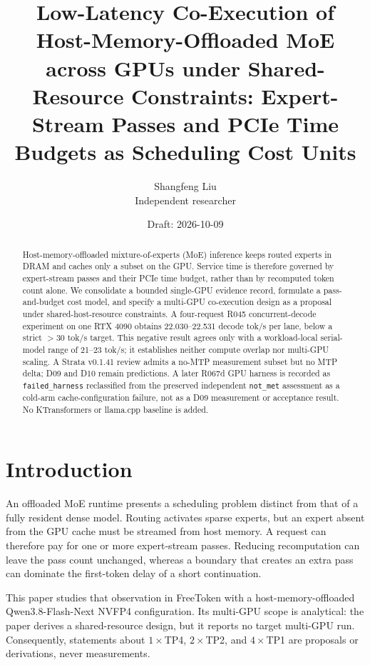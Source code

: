 \documentclass[11pt]{article}
\title{Low-Latency Co-Execution of Host-Memory-Offloaded MoE across GPUs under Shared-Resource Constraints: Expert-Stream Passes and PCIe Time Budgets as Scheduling Cost Units}
\author{Shangfeng Liu\\Independent researcher}
\date{Draft: 2026-10-09}
\begin{document}
\maketitle

\begin{abstract}
Host-memory-offloaded mixture-of-experts (MoE) inference keeps routed experts in DRAM and caches only a subset on the GPU. Service time is therefore governed by expert-stream passes and their PCIe time budget, rather than by recomputed token count alone. We consolidate a bounded single-GPU evidence record, formulate a pass-and-budget cost model, and specify a multi-GPU co-execution design as a proposal under shared-host-resource constraints. A four-request R045 concurrent-decode experiment on one RTX 4090 obtains 22.030--22.531 decode tok/s per lane, below a strict $>30$ tok/s target. This negative result agrees only with a workload-local serial-model range of 21--23 tok/s; it establishes neither compute overlap nor multi-GPU scaling. A Strata v0.1.41 review admits a no-MTP measurement subset but no MTP delta; D09 and D10 remain predictions. A later R067d GPU harness is recorded as \texttt{failed\_harness} reclassified from the preserved independent \texttt{not\_met} assessment as a cold-arm cache-configuration failure, not as a D09 measurement or acceptance result. No KTransformers or llama.cpp baseline is added.
\end{abstract}

\section{Introduction}

An offloaded MoE runtime presents a scheduling problem distinct from that of a fully resident dense model. Routing activates sparse experts, but an expert absent from the GPU cache must be streamed from host memory. A request can therefore pay for one or more expert-stream passes. Reducing recomputation can leave the pass count unchanged, whereas a boundary that creates an extra pass can dominate the first-token delay of a short continuation.

This paper studies that observation in FreeToken with a host-memory-offloaded Qwen3.8-Flash-Next NVFP4 configuration. Its multi-GPU scope is analytical: the paper derives a shared-resource design, but it reports no target multi-GPU run. Consequently, statements about $1\times$TP4, $2\times$TP2, and $4\times$TP1 are proposals or derivations, never measurements.
\end{document}
